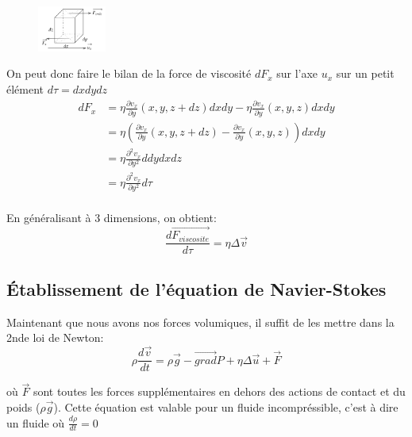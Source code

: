 \documentclass[a4paper,10pt]{report}
\begin{document}
\begin{figure}
 \includegraphics[width=0.2\textwidth]{equivalent_force_de_viscosite_volumique}

\end{figure}
On peut donc faire le bilan de la force de viscosité $dF_x$ sur l'axe $u_x$ sur un petit élément $d\tau = dxdydz$
\begin{align*}
 dF_x &= \eta \frac{\partial v_x}{\partial y}(x, y, z + dz) dxdy - \eta \frac{\partial v_x}{\partial y}(x, y, z) dxdy \\
      &= \eta (\frac{\partial v_x}{\partial y}(x, y, z + dz) - \frac{\partial v_x}{\partial y}(x, y, z)) dxdy \\
      &= \eta \frac{\partial^2 v_x}{\partial y^2} ddydxdz \\
      &= \eta \frac{\partial^2 v_x}{\partial y^2} d\tau
\end{align*}
\\
En généralisant à 3 dimensions, on obtient:
$$ \boxed{\frac{d\vec{F_{viscosite}}}{d\tau} = \eta \Delta \vec{v} }$$

\newpage
\subsection{Établissement de l'équation de Navier-Stokes}
Maintenant que nous avons nos forces volumiques, il suffit de les mettre dans la 2nde loi de Newton:
$$ \boxed{\rho \frac{d\vec{v}}{dt} = \rho \vec{g} - \vec{grad} P + \eta \Delta \vec{u} + \vec{F}}$$

où $\vec{F}$ sont toutes les forces supplémentaires en dehors des actions de contact et du poids ($\rho \vec{g}$).
Cette équation est valable pour un fluide incompréssible, c'est à dire un fluide où $\frac{d \rho}{dt} = 0$
\end{document}
